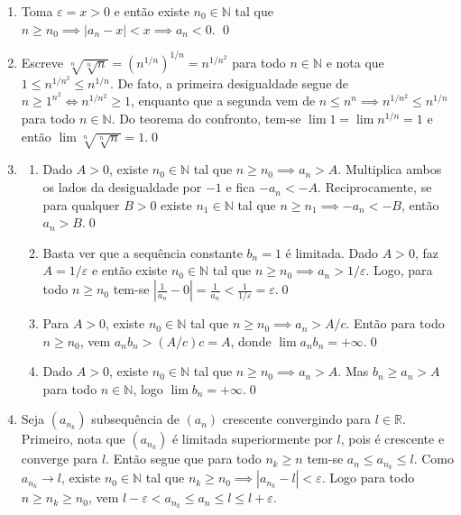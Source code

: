 \documentclass{article}
\begin{document}
\begin{enumerate}
    \item [\textbf{E7}] Toma \(\varepsilon = x > 0\) e então existe \(n_0 \in \mathbb{N}\) tal que \(n \geq n_0 \implies |a_n - x| < x \implies a_n < 0\). \qed
    \item [\textbf{E8}] Escreve \(\sqrt[n]{\sqrt[n]{n}} = (n^{1/n})^{1/n} = n^{1/n^2}\) para todo \(n \in \mathbb{N}\) e nota que \(1 \leq n^{1/n^2} \leq n^{1/n}\). De fato, a primeira desigualdade segue de \(n \geq 1^{n^2} \iff n^{1/n^2} \geq 1\), enquanto que a segunda vem de \(n \leq n^n \implies n^{1/n^2} \leq n^{1/n}\) para todo \(n \in \mathbb{N}\). Do teorema do confronto, tem-se \(\lim 1 = \lim n^{1/n} = 1\) e então \(\lim \sqrt[n]{\sqrt[n]{n}} = 1\).\qed
    \item [\textbf{E9}]
        \begin{enumerate}
            \item [(a)] Dado \(A>0\), existe \(n_0 \in \mathbb{N}\) tal que \(n \geq n_0 \implies a_n > A\). Multiplica ambos os lados da desigualdade por \(-1\) e fica \(-a_n < -A\). Reciprocamente, se para qualquer \(B>0\) existe \(n_1 \in \mathbb{N}\) tal que \(n \geq n_1 \implies -a_n < -B\), então \(a_n > B\).\qed
            \item [(b)] Basta ver que a sequência constante \(b_n = 1\) é limitada. Dado \(A>0\), faz \(A = 1/\varepsilon\) e então existe \(n_0 \in \mathbb{N}\) tal que \(n \geq n_0 \implies a_n > 1/\varepsilon\). Logo, para todo \(n \geq n_0\) tem-se \(\left\vert\frac{1}{a_n} - 0\right\vert = \frac{1}{a_n} < \frac{1}{1/\varepsilon} = \varepsilon\).\qed
            \item [(c)] Para \(A>0\), existe \(n_0 \in \mathbb{N}\) tal que \(n \geq n_0 \implies a_n > A/c\). Então para todo \(n \geq n_0\), vem \(a_n b_n > (A/c)c = A\), donde \(\lim a_n b_n = +\infty\).\qed
            \item [(d)] Dado \(A>0\), existe \(n_0 \in \mathbb{N}\) tal que \(n \geq n_0 \implies a_n > A\). Mas \(b_n \geq a_n > A\) para todo \(n \in \mathbb{N}\), logo \(\lim b_n = +\infty\).\qed
        \end{enumerate}
    \item [\textbf{E10}] Seja \((a_{n_k})\) subsequência de \((a_n)\) crescente convergindo para \(l \in \mathbb{R}\). Primeiro, nota que \((a_{n_k})\) é limitada superiormente por \(l\), pois é crescente e converge para \(l\). Então segue que para todo \(n_k \geq n\) tem-se \(a_n \leq a_{n_k} \leq l\).
        Como \(a_{n_k} \to l\), existe \(n_0 \in \mathbb{N}\) tal que \(n_k \geq n_0 \implies |a_{n_k} - l| < \varepsilon\). Logo para todo \(n \geq n_k \geq n_0\), vem \(l - \varepsilon < a_{n_k} \leq a_n \leq l \leq l + \varepsilon\).


\end{enumerate}
\end{document}

